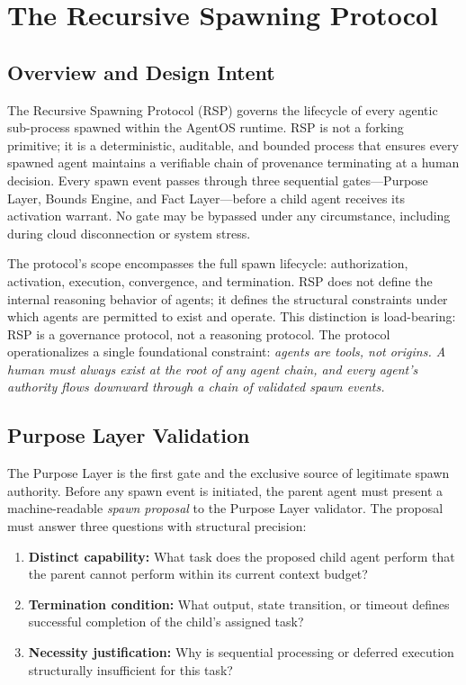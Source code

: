 \section{The Recursive Spawning Protocol}
\label{sec:recursive-spawning-protocol}

\subsection{Overview and Design Intent}
\label{sec:rsp-overview}

The Recursive Spawning Protocol (RSP) governs the lifecycle of every agentic sub-process spawned within the AgentOS runtime. RSP is not a forking primitive; it is a deterministic, auditable, and bounded process that ensures every spawned agent maintains a verifiable chain of provenance terminating at a human decision. Every spawn event passes through three sequential gates---Purpose Layer, Bounds Engine, and Fact Layer---before a child agent receives its activation warrant. No gate may be bypassed under any circumstance, including during cloud disconnection or system stress.

The protocol's scope encompasses the full spawn lifecycle: authorization, activation, execution, convergence, and termination. RSP does not define the internal reasoning behavior of agents; it defines the structural constraints under which agents are permitted to exist and operate. This distinction is load-bearing: RSP is a governance protocol, not a reasoning protocol. The protocol operationalizes a single foundational constraint: \textit{agents are tools, not origins. A human must always exist at the root of any agent chain, and every agent's authority flows downward through a chain of validated spawn events.}

\subsection{Purpose Layer Validation}
\label{sec:rsp-purpose-layer}

The Purpose Layer is the first gate and the exclusive source of legitimate spawn authority. Before any spawn event is initiated, the parent agent must present a machine-readable \textit{spawn proposal} to the Purpose Layer validator. The proposal must answer three questions with structural precision:

\begin{enumerate}
    \itemsep0em
    \item \textbf{Distinct capability:} What task does the proposed child agent perform that the parent cannot perform within its current context budget?
    \item \textbf{Termination condition:} What output, state transition, or timeout defines successful completion of the child's assigned task?
    \item \textbf{Necessity justification:} Why is sequential processing or deferred execution structurally insufficient for this task?
\end{enumerate}

